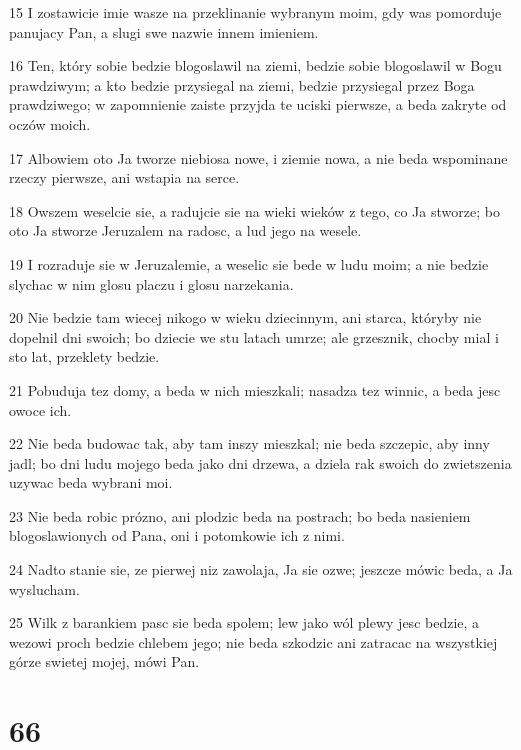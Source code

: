 \par 15 I zostawicie imie wasze na przeklinanie wybranym moim, gdy was pomorduje panujacy Pan, a slugi swe nazwie innem imieniem.
\par 16 Ten, który sobie bedzie blogoslawil na ziemi, bedzie sobie blogoslawil w Bogu prawdziwym; a kto bedzie przysiegal na ziemi, bedzie przysiegal przez Boga prawdziwego; w zapomnienie zaiste przyjda te uciski pierwsze, a beda zakryte od oczów moich.
\par 17 Albowiem oto Ja tworze niebiosa nowe, i ziemie nowa, a nie beda wspominane rzeczy pierwsze, ani wstapia na serce.
\par 18 Owszem weselcie sie, a radujcie sie na wieki wieków z tego, co Ja stworze; bo oto Ja stworze Jeruzalem na radosc, a lud jego na wesele.
\par 19 I rozraduje sie w Jeruzalemie, a weselic sie bede w ludu moim; a nie bedzie slychac w nim glosu placzu i glosu narzekania.
\par 20 Nie bedzie tam wiecej nikogo w wieku dziecinnym, ani starca, któryby nie dopelnil dni swoich; bo dziecie we stu latach umrze; ale grzesznik, chocby mial i sto lat, przeklety bedzie.
\par 21 Pobuduja tez domy, a beda w nich mieszkali; nasadza tez winnic, a beda jesc owoce ich.
\par 22 Nie beda budowac tak, aby tam inszy mieszkal; nie beda szczepic, aby inny jadl; bo dni ludu mojego beda jako dni drzewa, a dziela rak swoich do zwietszenia uzywac beda wybrani moi.
\par 23 Nie beda robic prózno, ani plodzic beda na postrach; bo beda nasieniem blogoslawionych od Pana, oni i potomkowie ich z nimi.
\par 24 Nadto stanie sie, ze pierwej niz zawolaja, Ja sie ozwe; jeszcze mówic beda, a Ja wyslucham.
\par 25 Wilk z barankiem pasc sie beda spolem; lew jako wól plewy jesc bedzie, a wezowi proch bedzie chlebem jego; nie beda szkodzic ani zatracac na wszystkiej górze swietej mojej, mówi Pan.

\chapter{66}

